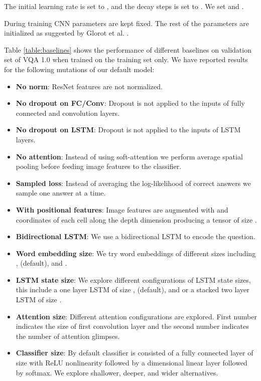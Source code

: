 \documentclass[10pt,twocolumn,letterpaper]{article}
\begin{document}
The initial learning rate is set to , and the decay steps is set to . We set  and .

During training CNN parameters are kept fixed. The rest of the parameters are initialized as suggested by Glorot et al. \cite{Glorot2010UnderstandingTD}.

Table \ref{table:baselines} shows the performance of different baselines on validation set of VQA 1.0 \cite{Antol2015VQAVQ} when trained on the training set only. We have reported results for the following mutations of our default model:
\begin{itemize}
	\item \textbf{No  norm}: ResNet features are not  normalized.
	\item \textbf{No dropout on FC/Conv}: Dropout is not applied to the inputs of fully connected and convolution layers.
	\item \textbf{No dropout on LSTM}: Dropout is not applied to the inputs of LSTM layers.
	\item \textbf{No attention}: Instead of using soft-attention we perform average spatial pooling before feeding image features to the classifier.
	\item \textbf{Sampled loss}: Instead of averaging the log-likelihood of correct answers we sample one answer at a time.	
	\item \textbf{With positional features}: Image features  are augmented with  and  coordinates of each cell along the depth dimension producing a tensor of size .
	\item \textbf{Bidirectional LSTM}: We use a bidirectional LSTM to encode the question.	
	\item \textbf{Word embedding size}: We try word embeddings of different sizes including ,  (default), and .
	\item \textbf{LSTM state size}: We explore different configurations of LSTM state sizes, this include a one layer LSTM of size ,  (default), and  or a stacked two layer LSTM of size .
	\item \textbf{Attention size}: Different attention configurations are explored. First number indicates the size of first convolution layer and the second number indicates the number of attention glimpses.
	\item \textbf{Classifier size}: By default classifier  is consisted of a fully connected layer of size  with ReLU nonlinearity followed by a  dimensional linear layer followed by softmax. We explore shallower, deeper, and wider alternatives.
\end{itemize}
\end{document}
